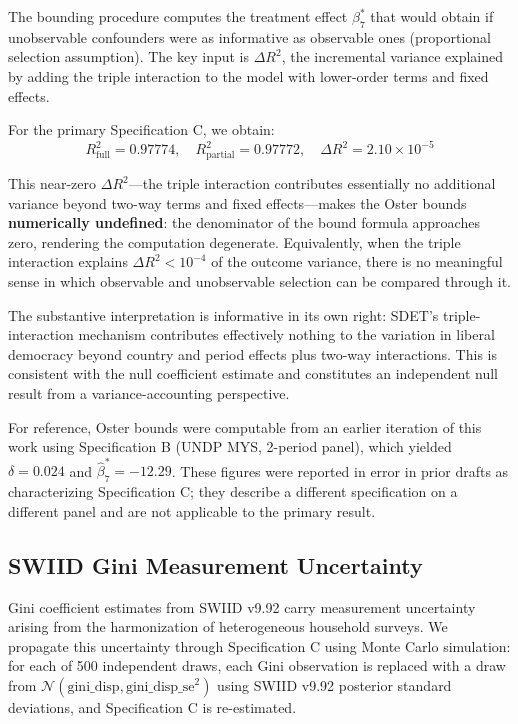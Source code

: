 \documentclass[11pt,letterpaper]{article}
\begin{document}
The \citet{Oster2019} bounding procedure computes the treatment effect $\beta_7^*$ that would
obtain if unobservable confounders were as informative as observable ones (proportional selection
assumption). The key input is $\Delta R^2$, the incremental variance explained by adding the
triple interaction to the model with lower-order terms and fixed effects.

For the primary Specification C, we obtain:
\[
  R^2_\text{full} = 0.97774, \quad R^2_\text{partial} = 0.97772, \quad
  \Delta R^2 = 2.10 \times 10^{-5}
\]

This near-zero $\Delta R^2$---the triple interaction contributes essentially no additional variance
beyond two-way terms and fixed effects---makes the Oster bounds \textbf{numerically undefined}: the
denominator of the bound formula approaches zero, rendering the computation degenerate.
Equivalently, when the triple interaction explains $\Delta R^2 < 10^{-4}$ of the outcome variance,
there is no meaningful sense in which observable and unobservable selection can be compared through
it.

The substantive interpretation is informative in its own right: SDET's triple-interaction mechanism
contributes effectively nothing to the variation in liberal democracy beyond country and period
effects plus two-way interactions. This is consistent with the null coefficient estimate and
constitutes an independent null result from a variance-accounting perspective.

For reference, Oster bounds were computable from an earlier iteration of this work using
Specification B (UNDP MYS, 2-period panel), which yielded $\delta = 0.024$ and
$\hat{\beta}_7^* = -12.29$. These figures were reported in error in prior drafts as characterizing
Specification C; they describe a different specification on a different panel and are not applicable
to the primary result.

\subsection{SWIID Gini Measurement Uncertainty}
\label{subsec:swiid}

Gini coefficient estimates from SWIID v9.92 carry measurement uncertainty arising from the
harmonization of heterogeneous household surveys. We propagate this uncertainty through
Specification C using Monte Carlo simulation: for each of 500 independent draws, each Gini
observation is replaced with a draw from $\mathcal{N}(\text{gini\_disp}, \text{gini\_disp\_se}^2)$
using SWIID v9.92 posterior standard deviations, and Specification C is re-estimated.
\end{document}
